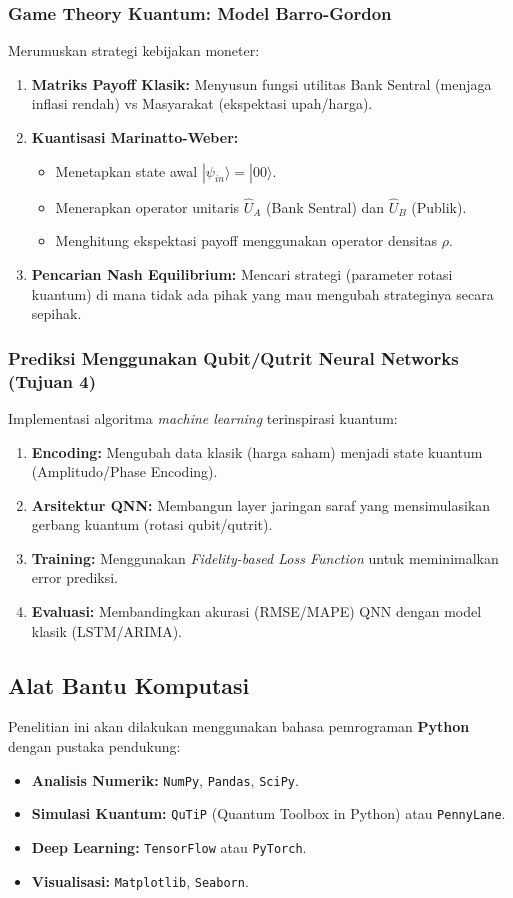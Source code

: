\subsubsection{Game Theory Kuantum: Model Barro-Gordon}
Merumuskan strategi kebijakan moneter:
\begin{enumerate}
    \item \textbf{Matriks Payoff Klasik:} Menyusun fungsi utilitas Bank Sentral (menjaga inflasi rendah) vs Masyarakat (ekspektasi upah/harga).
    \item \textbf{Kuantisasi Marinatto-Weber:}
    \begin{itemize}
        \item Menetapkan state awal $|{\psi}_{in}\rangle = |00\rangle$.
        \item Menerapkan operator unitaris $\hat{U}_A$ (Bank Sentral) dan $\hat{U}_B$ (Publik).
        \item Menghitung ekspektasi payoff menggunakan operator densitas $\rho$.
    \end{itemize}
    \item \textbf{Pencarian Nash Equilibrium:} Mencari strategi (parameter rotasi kuantum) di mana tidak ada pihak yang mau mengubah strateginya secara sepihak.
\end{enumerate}

\subsubsection{Prediksi Menggunakan Qubit/Qutrit Neural Networks (Tujuan 4)}
Implementasi algoritma \textit{machine learning} terinspirasi kuantum:
\begin{enumerate}
    \item \textbf{Encoding:} Mengubah data klasik (harga saham) menjadi state kuantum (Amplitudo/Phase Encoding).
    \item \textbf{Arsitektur QNN:} Membangun layer jaringan saraf yang mensimulasikan gerbang kuantum (rotasi qubit/qutrit).
    \item \textbf{Training:} Menggunakan \textit{Fidelity-based Loss Function} untuk meminimalkan error prediksi.
    \item \textbf{Evaluasi:} Membandingkan akurasi (RMSE/MAPE) QNN dengan model klasik (LSTM/ARIMA).
\end{enumerate}

\subsection{Alat Bantu Komputasi}
Penelitian ini akan dilakukan menggunakan bahasa pemrograman \textbf{Python} dengan pustaka pendukung:
\begin{itemize}
    \item \textbf{Analisis Numerik:} \texttt{NumPy}, \texttt{Pandas}, \texttt{SciPy}.
    \item \textbf{Simulasi Kuantum:} \texttt{QuTiP} (Quantum Toolbox in Python) atau \texttt{PennyLane}.
    \item \textbf{Deep Learning:} \texttt{TensorFlow} atau \texttt{PyTorch}.
    \item \textbf{Visualisasi:} \texttt{Matplotlib}, \texttt{Seaborn}.
\end{itemize}

